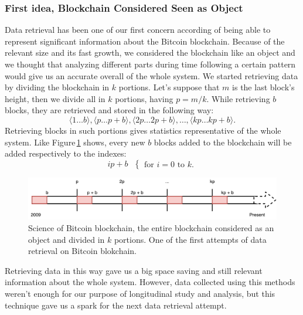 \documentclass[USenglish]{uit-thesis}
\begin{document}
\subsubsection{First idea, Blockchain Considered Seen as Object}
Data retrieval has been one of our first concern according
of being able to represent significant information about
the Bitcoin blockchain. Because of the relevant size
and its fast growth, we considered the blockchain like
an object and we thought that analyzing different
parts during time following a certain pattern would
give us an accurate overall of the whole system. We
started retrieving data by dividing the blockchain in
$k$ portions.
Let's suppose that $m$ is the last
block's height, then we divide
all in $k$ portions, having $p = m / k$.
While retrieving $b$ blocks, they are
retrieved and stored in the following way:
\[\langle 1 \dots b\rangle, \langle p \dots p+b\rangle, \langle 2p \dots 2p + b \rangle, \dots , \langle kp \dots kp+b\rangle.\]
Retrieving blocks in such portions gives
statistics representative of the whole system.
Like Figure\,\ref{fig:portions} shows,
every new $b$ blocks added to the
blockchain will be added respectively to the indexes:
\begin{equation}
ip + b\textrm{ }
\begin{cases}
\textrm{for } i = 0 \textrm{ to } k.
\end{cases}
\end{equation}
\begin{figure}[h]
	\centering
	\includegraphics[width=1\textwidth]{img/portions}
	\caption{Science of Bitcoin blockchain, the entire blockchain considered as
		an object and divided in $k$ portions. One of the first attempts of data
	retrieval on Bitcoin blokchain.}
	\label{fig:portions}
\end{figure}
Retrieving data in this way gave us a big space saving and still
relevant information about the whole system. However, data
collected using this methods weren't enough for our purpose
of longitudinal study and analysis, but this technique gave us
a spark for the next data retrieval attempt.
\end{document}
